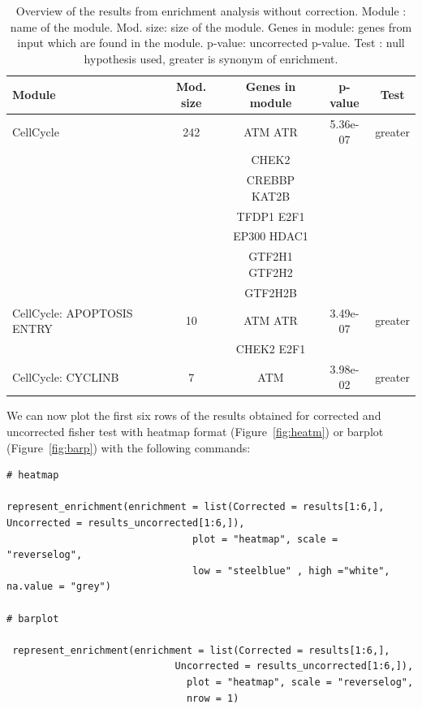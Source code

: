 \documentclass{article}
\begin{document}
\begin{table}[h!]
  \centering
  \caption{Overview of the results from enrichment analysis without correction.
  Module : name of the module. Mod. size: size of the module. Genes in module:
  genes from input which are found in the module. p-value: uncorrected p-value.
  Test : null hypothesis used, greater is synonym of enrichment.}
  \label{tab:table2}

  \begin{tabular}{l c c c c}
	\hline
Module & Mod. size & Genes in module & p-value & Test\\
	\hline
CellCycle & 242 & ATM ATR & 5.36e-07 & greater \\
          &   &  CHEK2 &   &     \\
          &   &  CREBBP KAT2B &   &     \\
          &   &  TFDP1 E2F1  &    &     \\
          &	  &  EP300 HDAC1 &	& \\
          &	  &  GTF2H1 GTF2H2 &	& \\
          &	  &  GTF2H2B &	& \\
CellCycle: APOPTOSIS ENTRY & 10 & ATM ATR & 3.49e-07 &greater  \\
 & & CHEK2 E2F1 &  & \\
CellCycle: CYCLINB			& 7  & ATM 				  & 3.98e-02 & greater \\



	\hline

	\end{tabular}
\end{table}

We can now plot the first six rows of the results obtained for corrected and
uncorrected fisher test with heatmap format (Figure~\ref{fig:heatm}) or barplot
(Figure~\ref{fig:barp}) with the following commands:

\begin{verbatim}
# heatmap

represent_enrichment(enrichment = list(Corrected = results[1:6,], 
Uncorrected = results_uncorrected[1:6,]),
                                plot = "heatmap", scale = "reverselog", 
                                low = "steelblue" , high ="white", na.value = "grey")

# barplot 

 represent_enrichment(enrichment = list(Corrected = results[1:6,], 
                             Uncorrected = results_uncorrected[1:6,]),
                               plot = "heatmap", scale = "reverselog", 
                               nrow = 1)
\end{verbatim}
\end{document}
